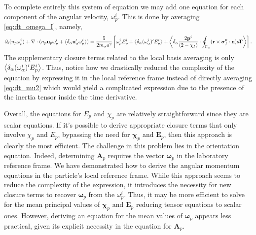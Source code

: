 To complete entirely this system of equation we may add one equation for each component of the angular velocity, $\omega_p^i$. 
This is done by averaging \ref{eq:dt_omega_I}, namely,
\begin{align*}
    \partial_t (n_p \omega^i_p)
    + \mathbf{\nabla}\cdot (
        n_p \textbf{u}_p \omega^i_p 
        + \left<\delta_\alpha \textbf{u}_\alpha' \omega^i_p\right>
    )
    = 
    \frac{5}{2 m_\alpha a^2}\left[
        \omega^i_p E^i_p + \left<\delta_\alpha (\omega^i_\alpha)' E^i_p\right>
        +\left<\delta_\alpha 
        \frac{2 \textbf{p}^i}{ (2 - \chi_I)}\cdot 
        \oint_{\Gamma_{\alpha}} (\textbf{r}\times\bm\sigma_f^0\cdot \textbf{n}) d\Gamma 
        \right>
    \right]. 
\end{align*}
The supplementary closure terms related to the local basis averaging is only $\left<\delta_\alpha (\omega^i_\alpha)' E^i_p\right>$.
Thus, notice how we drastically reduced the complexity of the equation by expressing it in the local reference frame instead of directly averaging \ref{eq:dt_mu2} which would yield a complicated expression due to the presence of the inertia tensor inside the time derivative.  

Overall, the equations for $E_p$ and $\chi_p$ are relatively straightforward since they are scalar equations. 
If it's possible to derive appropriate closure terms that only involve $\chi_p$ and $E_p$, bypassing the need for $\bm\chi_p$ and $\textbf{E}_p$, then this approach is clearly the most efficient. 
The challenge in this problem lies in the orientation equation.
Indeed, determining $\textbf{A}_p$ requires the vector $\bm\omega_p$ in the laboratory reference frame.
We have demonstrated how to derive the angular momentum equations in the particle's local reference frame. 
While this approach seems to reduce the complexity of the expression, it introduces the necessity for new closure terms to recover $\bm\omega_p$ from the $\omega^i_p$. 
Thus, it may be more efficient to solve for the mean principal values of $\bm\chi_p$ and $\textbf{E}_p$ reducing tensor equations to scalar ones.
However, deriving an equation for the mean values of $\bm\omega_p$ appears less practical, given its explicit necessity in the equation for $\textbf{A}_p$. 

